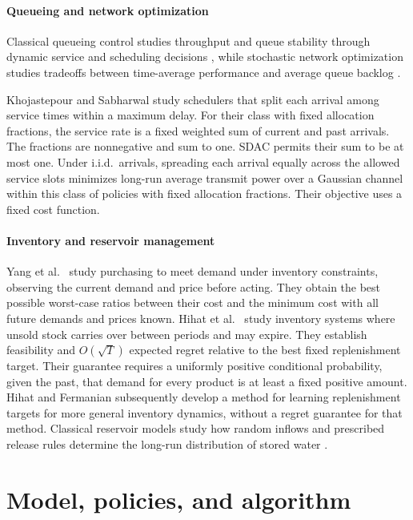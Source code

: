 \paragraph{Queueing and network optimization}
Classical queueing control studies throughput and queue stability through dynamic
service and scheduling decisions
\cite{tassiulas1990stability,tassiulas1993dynamic,mckeown1999achieving}, while
stochastic network optimization studies tradeoffs between time-average performance
and average queue backlog \cite{neely2010stochastic}.

Khojastepour and Sabharwal \cite{khojastepour2004delay} study schedulers
that split each arrival among service times within a maximum delay. For
their class with fixed allocation fractions, the service rate is a fixed
weighted sum of current and past arrivals. The fractions are nonnegative
and sum to one. SDAC permits their sum to be at most one. Under i.i.d.\
arrivals, spreading each arrival equally across the allowed service slots
minimizes long-run average transmit power over a Gaussian channel within
this class of policies with fixed allocation fractions. Their objective
uses a fixed cost function.

\paragraph{Inventory and reservoir management}
Yang et al.\ \cite{yang2020online} study purchasing to meet demand under
inventory constraints, observing the current demand and price before
acting. They obtain the best possible worst-case ratios between their
cost and the minimum cost with all future demands and prices known.
Hihat et al.\ \cite{hihat2023inventory} study inventory systems where
unsold stock carries over between periods and may expire. They establish
feasibility and $O(\sqrt{T})$ expected regret relative to the best fixed
replenishment target. Their guarantee requires a uniformly positive
conditional probability, given the past, that demand for every product is
at least a fixed positive amount. Hihat and Fermanian
\cite{hihat2024online} subsequently develop a method for learning
replenishment targets for more general inventory dynamics, without a
regret guarantee for that method. Classical reservoir models study how
random inflows and prescribed release rules determine the long-run
distribution of stored water \cite{moran1956continuous}.

\section{Model, policies, and algorithm}
\label{ch4:sec:scalar}

